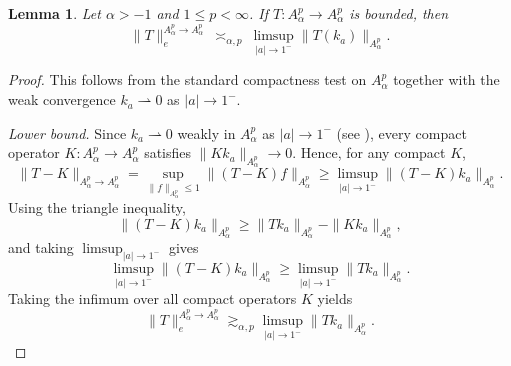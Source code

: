 \documentclass[preprint,12pt]{elsarticle}
\numberwithin{equation}{section}
\newtheorem{lemma}{Lemma}[section]
\theoremstyle{remark}
\begin{document}
\begin{lemma}\label{lem:ess-kernel-bergman}
Let $\alpha>-1$ and $1\le p<\infty$. If $T:A_\alpha^p\to A_\alpha^p$ is bounded, then
\begin{equation}\label{eq:ess-kernel-bergman}
\|T\|_{e}^{A_\alpha^p\to A_\alpha^p}
\ \asymp_{\alpha,p}\
\limsup_{|a|\to 1^-}\|T(k_a)\|_{A_\alpha^p}.
\end{equation}
\end{lemma}
\begin{proof}
This follows from the standard compactness test on $A_\alpha^p$ together with the weak
convergence $k_a\rightharpoonup 0$ as $|a|\to 1^-$.

\medskip
\noindent\textit{Lower bound.}
Since $k_a\rightharpoonup 0$ weakly in $A_\alpha^p$ as $|a|\to 1^-$
(see \cite[Ch.~2]{Zhu2005}), every compact operator $K:A_\alpha^p\to A_\alpha^p$ satisfies
$\|Kk_a\|_{A_\alpha^p}\to 0$. Hence, for any compact $K$,
\begin{equation*}
\|T-K\|_{A_\alpha^p\to A_\alpha^p}
=
\sup_{\|f\|_{A_\alpha^p}\le 1}\|(T-K)f\|_{A_\alpha^p}
\ge
\limsup_{|a|\to 1^-}\|(T-K)k_a\|_{A_\alpha^p}.
\end{equation*}
Using the triangle inequality,
\begin{equation*}
\|(T-K)k_a\|_{A_\alpha^p}
\ge
\|Tk_a\|_{A_\alpha^p}-\|Kk_a\|_{A_\alpha^p},
\end{equation*}
and taking $\limsup_{|a|\to 1^-}$ gives
\begin{equation*}
\limsup_{|a|\to 1^-}\|(T-K)k_a\|_{A_\alpha^p}
\ge
\limsup_{|a|\to 1^-}\|Tk_a\|_{A_\alpha^p}.
\end{equation*}
Taking the infimum over all compact operators $K$ yields
\begin{equation*}
\|T\|_{e}^{A_\alpha^p\to A_\alpha^p}
\gtrsim_{\alpha,p}
\limsup_{|a|\to 1^-}\|Tk_a\|_{A_\alpha^p}.
\end{equation*}


\end{proof}
\end{document}
